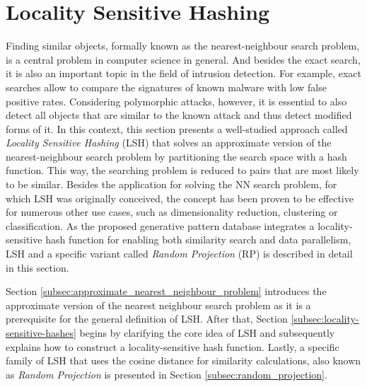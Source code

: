 \documentclass[../../../main.tex]{subfiles}
\begin{document}
\section{Locality Sensitive Hashing}
Finding similar objects, formally known as the nearest-neighbour search problem, is a central problem in computer science in general. And besides the exact search, it is also an important topic in the field of intrusion detection. For example, exact searches allow to compare the signatures of known malware with low false positive rates. Considering polymorphic attacks, however, it is essential to also detect all objects that are similar to the known attack and thus detect modified forms of it. In this context, this section presents a well-studied approach called \textit{Locality Sensitive Hashing} (LSH) that solves an approximate version of the nearest-neighbour search problem by partitioning the search space with a hash function. This way, the searching problem is reduced to pairs that are most likely to be similar. Besides the application for solving the NN search problem, for which LSH was originally conceived, the concept has been proven to be effective for numerous other use cases, such as dimensionality reduction, clustering or classification. As the proposed generative pattern database integrates a locality-sensitive hash function for enabling both similarity search and data parallelism, LSH and a specific variant called \textit{Random Projection} (RP) is described in detail in this section.

Section \ref{subsec:approximate_nearest_neighbour_problem} introduces the approximate version of the nearest neighbour search problem as it is a prerequisite for the general definition of LSH. After that, Section \ref{subsec:locality-sensitive-hashes} begins by clarifying the core idea of LSH and subsequently explains how to construct a locality-sensitive hash function. Lastly, a specific family of LSH that uses the cosine distance for similarity calculations, also known as \textit{Random Projection} is presented in Section \ref{subsec:random_projection}.






\end{document}
